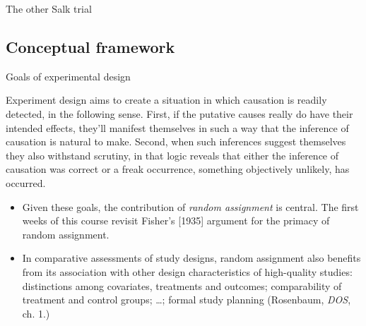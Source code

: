 \begin{frame}{The other Salk trial}

\end{frame}

\subsection{Conceptual framework}
\begin{frame}{Goals of experimental design}

Experiment design aims to create a situation in which causation is
readily detected, in the following sense. First, if the putative causes
really do have their intended effects, they'll manifest themselves in
such a way that the inference of causation is natural to make. Second,
when such inferences suggest themselves they also withstand scrutiny, in
that logic reveals that either the inference of causation was correct or
a freak occurrence, something objectively unlikely, has occurred.

\pause
\begin{itemize}[<+->]
\item Given these goals, the contribution of \textit{random
    assignment} is central.  The first weeks of this course revisit
  Fisher's [1935] argument for the primacy of random assignment.
\item In comparative assessments of study designs, random assignment also benefits
  from its association with other design characteristics of
  high-quality studies:  distinctions among covariates, treatments and
  outcomes; comparability of treatment and control groups; \ldots;
  formal study planning (Rosenbaum, \textit{DOS}, ch. 1.)
\end{itemize}

\end{frame}

